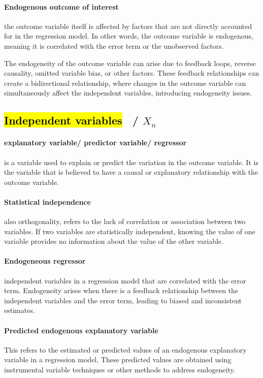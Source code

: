 \documentclass[a3paper, 8pt]{extarticle}
\begin{document}
\begin{multicols*}{5}
\paragraph{Endogenous outcome of interest}  the outcome variable itself is affected by factors that are not directly accounted for in the regression model. In other words, the outcome variable is endogenous, meaning it is correlated with the error term or the unobserved factors.

The endogeneity of the outcome variable can arise due to feedback loops, reverse causality, omitted variable bias, or other factors. These feedback relationships can create a bidirectional relationship, where changes in the outcome variable can simultaneously affect the independent variables, introducing endogeneity issues.

\subsection{\hl{Independent variables} \ / $X_n$}  
\paragraph{explanatory variable/ predictor variable/ regressor} is a variable used to explain or predict the variation in the outcome variable. It is the variable that is believed to have a causal or explanatory relationship with the outcome variable.

\paragraph{Statistical independence} also orthogonality, refers to the lack of correlation or association between two variables. If two variables are statistically independent, knowing the value of one variable provides no information about the value of the other variable.


\paragraph{Endogeneous regressor} independent variables in a regression model that are correlated with the error term. Endogeneity arises when there is a feedback relationship between the independent variables and the error term, leading to biased and inconsistent estimates.

\paragraph{Predicted endogenous explanatory variable} This refers to the estimated or predicted values of an endogenous explanatory variable in a regression model. These predicted values are obtained using instrumental variable techniques or other methods to address endogeneity.


\end{multicols*}
\end{document}
